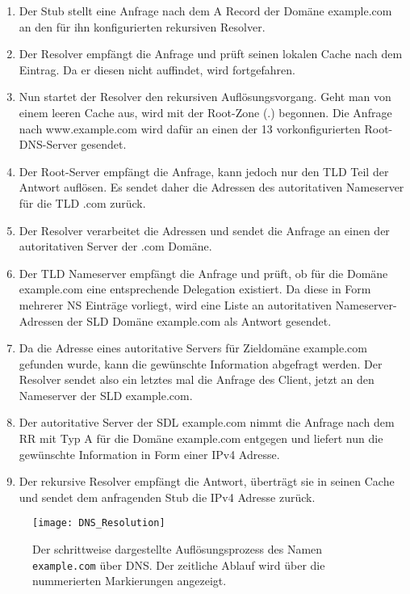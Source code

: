 \begin{enumerate}
    \item Der Stub stellt eine Anfrage nach dem A Record der Domäne example.com an den für ihn konfigurierten rekursiven Resolver.
    \item Der Resolver empfängt die Anfrage und prüft seinen lokalen Cache nach dem Eintrag. Da er diesen nicht auffindet, wird fortgefahren.
    \item Nun startet der Resolver den rekursiven Auflösungsvorgang. Geht man von einem leeren Cache aus, wird mit der Root-Zone (.) begonnen. Die Anfrage nach www.example.com wird dafür an einen der 13 vorkonfigurierten Root-DNS-Server gesendet.
    \item Der Root-Server empfängt die Anfrage, kann jedoch nur den TLD Teil der Antwort auflösen. Es sendet daher die Adressen des autoritativen Nameserver für die TLD .com zurück.
    \item Der Resolver verarbeitet die Adressen und sendet die Anfrage an einen der autoritativen Server der .com Domäne.
    \item Der TLD Nameserver empfängt die Anfrage und prüft, ob für die Domäne example.com eine entsprechende Delegation existiert. Da diese in Form mehrerer NS Einträge vorliegt, wird eine Liste an autoritativen Nameserver-Adressen der SLD Domäne example.com als Antwort gesendet.
    \item Da die Adresse eines autoritative Servers für Zieldomäne example.com gefunden wurde, kann die gewünschte Information abgefragt werden. Der Resolver sendet also ein letztes mal die Anfrage des Client, jetzt an den Nameserver der SLD example.com.
    \item Der autoritative Server der SDL example.com nimmt die Anfrage nach dem RR mit Typ A für die Domäne example.com entgegen und liefert nun die gewünschte Information in Form einer IPv4 Adresse.
    \item Der rekursive Resolver empfängt die Antwort, überträgt sie in seinen Cache und sendet dem anfragenden Stub die IPv4 Adresse zurück.
\end{enumerate}

\begin{figure}[htbp]
    \centering
    \texttt{[image: DNS\_Resolution]}
    \caption[Dargestellte des DNS Auflösungsprozess für \texttt{example.com}]{Der schrittweise dargestellte Auflösungsprozess des Namen \texttt{example.com} über DNS. Der zeitliche Ablauf wird über die nummerierten Markierungen angezeigt.}
    \label{img:dnsresolution}
\end{figure}

